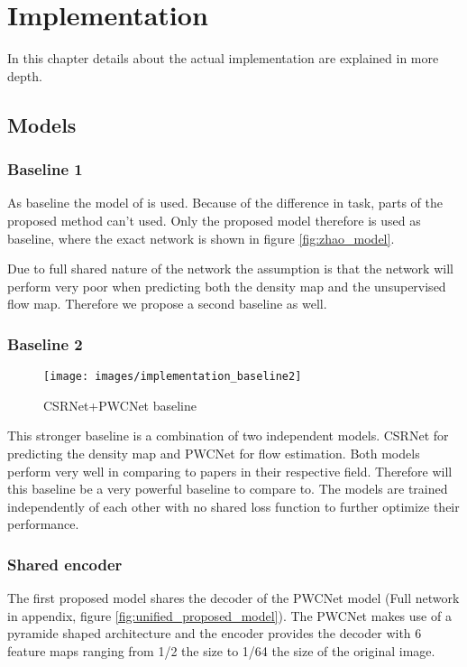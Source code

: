 \chapter{Implementation}
In this chapter details about the actual implementation are explained in more depth.

\section{Models}
\subsection{Baseline 1}
As baseline the model of \cite{Zhang2016} is used. Because of the difference in task, parts of the proposed method can't used. Only the proposed model therefore is used as baseline, where the exact network is shown in figure \ref{fig:zhao_model}.

Due to full shared nature of the network the assumption is that the network will perform very poor when predicting both the density map and the unsupervised flow map. Therefore we propose a second baseline as well.

\subsection{Baseline 2}

\begin{figure}[h]
\centering
\texttt{[image: images/implementation\_baseline2]}
\caption{CSRNet+PWCNet baseline}
\label{fig:unified_model}
\end{figure}

This stronger baseline is a combination of two independent models. CSRNet \cite{li2018csrnet} for predicting the density map and PWCNet \cite{sun_pwc-net_2018} for flow estimation. Both models perform very well in comparing to papers in their respective field. Therefore will this baseline be a very powerful baseline to compare to. The models are trained independently of each other with no shared loss function to further optimize their performance.

\subsection{Shared encoder}
The first proposed model shares the decoder of the PWCNet model (Full network in appendix, figure \ref{fig:unified_proposed_model}). The PWCNet makes use of a pyramide shaped architecture and the encoder provides the decoder with 6 feature maps ranging from 1/2 the size to 1/64 the size of the original image.

